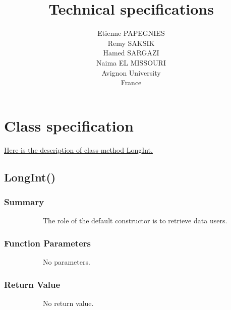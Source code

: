\documentclass[11pt]{report}
\begin{document}
    \title{Technical specifications}
    \author { 
    Etienne PAPEGNIES\\
    Remy SAKSIK\\
    Hamed SARGAZI\\
    Naima EL MISSOURI\\
    Avignon University\\
    France\\
}
   \maketitle

 \setcounter{tocdepth}{1}



    \tableofcontents
    
   \chapter*{Class specification}  

	\begin{bf}\underline{Here is the description of class method LongInt.}\end{bf}
    \section{LongInt()}
	\subsection{Summary}
~~~~~~~~~~~The role of the default constructor is to retrieve data users.
	\subsection{Function Parameters}
~~~~~~~~~~~No parameters.
	\subsection{Return Value}
~~~~~~~~~~~No return value.
	    
\end{document}
